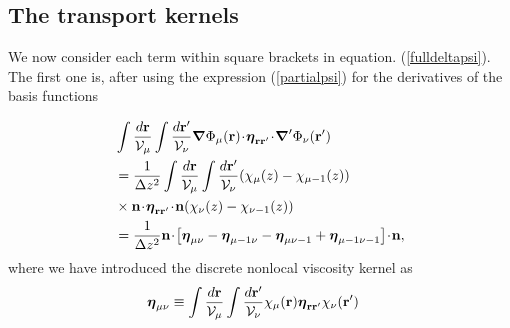 \documentclass[b5paper,openright,10pt]{book}
\newcommand{\esc}{\!\cdot\!}
\begin{document}
\subsection{The transport kernels}
We   now  consider   each  term   within  square   brackets  in 
equation. (\ref{fulldeltapsi}). The first one is, after using the expression
(\ref{partialpsi}) for the derivatives of the basis functions

\begin{align}
&\int \frac{d{\bf r}}{{\cal V}_\mu}
\int \frac{d{\bf r}'}{{\cal V}_\nu}
\boldsymbol{\nabla}\Phi_\mu({\bf r})
\esc\boldsymbol{\eta}_{{\bf r}{\bf r}'}\esc
{\boldsymbol{\nabla}^\prime}\Phi_\nu({\bf r}')
\nonumber\\
&=
\frac{1}{\Delta z^2}\int \frac{d{\bf r}}{{\cal V}_\mu}
\int \frac{d{\bf r}'}{{\cal V}_\nu}
(\chi_\mu(z)-\chi_{\mu-1}(z))
\nonumber\\
&\times{\bf n}\esc\boldsymbol{\eta}_{{\bf r}{\bf r}'}\esc{\bf n}(\chi_\nu(z)-\chi_{\nu-1}(z))
\nonumber\\
&=
\frac{1}{\Delta z^2} {\bf n}\esc\left[\boldsymbol{\eta}_{\mu\nu}-\boldsymbol{\eta}_{\mu-1\nu}-\boldsymbol{\eta}_{\mu\nu-1}+\boldsymbol{\eta}_{\mu-1\nu-1}\right]\esc{\bf n},
\label{TC1}
\end{align}
where we have introduced the discrete nonlocal viscosity kernel as
\begin{align}
\boldsymbol{\eta}_{\mu\nu}&\equiv  \int \frac{d{\bf r}}{{\cal V}_\mu}
\int \frac{d{\bf r}'}{{\cal V}_\nu}
\chi_\mu({\bf r})
\boldsymbol{\eta}_{{\bf r}{\bf r}'}\chi_\nu({\bf r}')
\label{s2disc}
\end{align}
\end{document}

